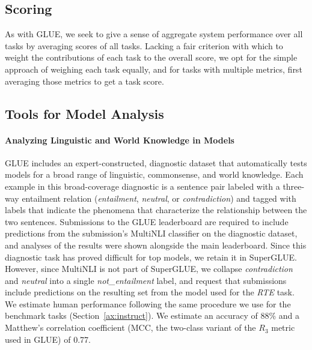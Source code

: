 \subsection{Scoring} As with GLUE, we seek to give a sense of aggregate system performance over all tasks by averaging scores of all tasks.
Lacking a fair criterion with which to weight the contributions of each task to the overall score, we opt for the simple approach of weighing each task equally, and for tasks with multiple metrics, first averaging those metrics to get a task score.

\subsection{Tools for Model Analysis}

\paragraph{Analyzing Linguistic and World Knowledge in Models}
GLUE includes an expert-constructed, diagnostic dataset that automatically tests models for a broad range of linguistic, commonsense, and world knowledge.
Each example in this broad-coverage diagnostic is a sentence pair labeled with a three-way entailment relation (\textit{entailment}, \textit{neutral}, or \textit{contradiction})
and tagged with labels that indicate the phenomena that characterize the relationship between the two sentences. Submissions to the GLUE leaderboard are required to include predictions from the submission's MultiNLI classifier on the diagnostic dataset, and analyses of the results were shown alongside the main leaderboard.
Since this diagnostic task has proved difficult for top models, we retain it in SuperGLUE.
However, since MultiNLI is not part of SuperGLUE, we collapse \textit{contradiction} and \textit{neutral} into a single \textit{not\_entailment} label, and request that submissions include predictions on the resulting set from the model used for the \textit{RTE} task.
We estimate human performance following the same procedure we use for the benchmark tasks (Section~\ref{ax:instruct}). %
We estimate an accuracy of 88\% and a Matthew's correlation coefficient (MCC, the two-class variant of the $R_3$ metric used in GLUE) of 0.77.

